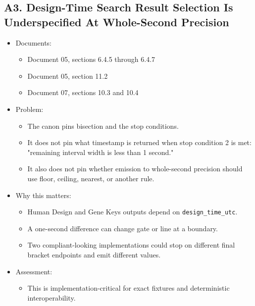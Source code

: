 \documentclass[11pt]{article}
\begin{document}
\subsection{A3. Design-Time Search Result Selection Is Underspecified At Whole-Second Precision}
\label{sec:orgd3652cd}
\begin{itemize}
\item Documents:
\begin{itemize}
\item Document 05, sections 6.4.5 through 6.4.7
\item Document 05, section 11.2
\item Document 07, sections 10.3 and 10.4
\end{itemize}
\item Problem:
\begin{itemize}
\item The canon pins bisection and the stop conditions.
\item It does not pin what timestamp is returned when stop condition 2 is met: "remaining interval width is less than 1 second."
\item It also does not pin whether emission to whole-second precision should use floor, ceiling, nearest, or another rule.
\end{itemize}
\item Why this matters:
\begin{itemize}
\item Human Design and Gene Keys outputs depend on \texttt{design\_time\_utc}.
\item A one-second difference can change gate or line at a boundary.
\item Two compliant-looking implementations could stop on different final bracket endpoints and emit different values.
\end{itemize}
\item Assessment:
\begin{itemize}
\item This is implementation-critical for exact fixtures and deterministic interoperability.
\end{itemize}
\end{itemize}
\end{document}
